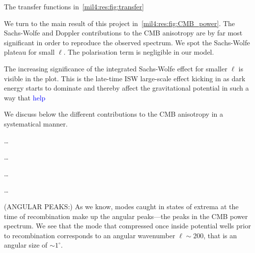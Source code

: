 


The transfer functions in~\cref{mil4:res:fig:transfer} 



We turn to the main result of this project in~\cref{mil4:res:fig:CMB_power}. The Sachs-Wolfe and Doppler contributions to the CMB anisotropy are by far most significant in order to reproduce the observed spectrum. We spot the Sachs-Wolfe plateau for small $\ell$. The polarisation term is negligible in our model. 

The increasing significance of the integrated Sachs-Wolfe effect for smaller $\ell$ is visible in the plot. This is the late-time ISW large-scale effect kicking in as dark energy starts to dominate and thereby affect the gravitational potential in such a way that \textcolor{blue}{help}


We discuss below the different contributions to the CMB anisotropy in a systematical manner.

\dots

\dots 

\dots 

\dots

(ANGULAR PEAKS:) As we know, modes caught in states of extrema at the time of recombination make up the angular peaks---the peaks in the CMB power spectrum. We see that the mode that compressed once inside potential wells prior to recombination corresponds to an angular wavenumber $\ell\sim 200$, that is an angular size of $\sim 1^\circ$. 